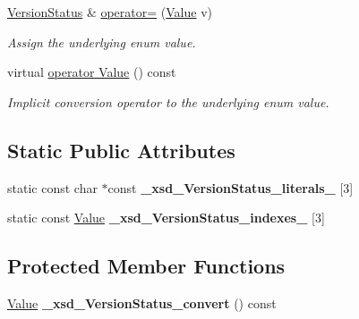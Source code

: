 \begin{DoxyCompactItemize}
\hyperlink{classopenstack_1_1xml_1_1VersionStatus}{VersionStatus} \& \hyperlink{classopenstack_1_1xml_1_1VersionStatus_a4118d6305b9ec88d2b3c972fcc7909ec}{operator=} (\hyperlink{classopenstack_1_1xml_1_1VersionStatus_a349f60055c2660ef73373729319b10f5}{Value} v)
\begin{DoxyCompactList}\small\item\em Assign the underlying enum value. \item\end{DoxyCompactList}\item 
virtual \hyperlink{classopenstack_1_1xml_1_1VersionStatus_ab31e9f0ec05e0b427463f6393d97d674}{operator Value} () const 
\begin{DoxyCompactList}\small\item\em Implicit conversion operator to the underlying enum value. \item\end{DoxyCompactList}\end{DoxyCompactItemize}
\subsection*{Static Public Attributes}
\begin{DoxyCompactItemize}
\item 
\hypertarget{classopenstack_1_1xml_1_1VersionStatus_a9df329502bdca84428b2c11dc7e143e3}{
static const char $\ast$const {\bfseries \_\-xsd\_\-VersionStatus\_\-literals\_\-} \mbox{[}3\mbox{]}}
\label{classopenstack_1_1xml_1_1VersionStatus_a9df329502bdca84428b2c11dc7e143e3}

\item 
\hypertarget{classopenstack_1_1xml_1_1VersionStatus_a1032a36fd1a39e888444db13704de3d9}{
static const \hyperlink{classopenstack_1_1xml_1_1VersionStatus_a349f60055c2660ef73373729319b10f5}{Value} {\bfseries \_\-xsd\_\-VersionStatus\_\-indexes\_\-} \mbox{[}3\mbox{]}}
\label{classopenstack_1_1xml_1_1VersionStatus_a1032a36fd1a39e888444db13704de3d9}

\end{DoxyCompactItemize}
\subsection*{Protected Member Functions}
\begin{DoxyCompactItemize}
\item 
\hypertarget{classopenstack_1_1xml_1_1VersionStatus_a78f97cc588046a33aa086d7bbe7adad6}{
\hyperlink{classopenstack_1_1xml_1_1VersionStatus_a349f60055c2660ef73373729319b10f5}{Value} {\bfseries \_\-xsd\_\-VersionStatus\_\-convert} () const }
\label{classopenstack_1_1xml_1_1VersionStatus_a78f97cc588046a33aa086d7bbe7adad6}

\end{DoxyCompactItemize}


